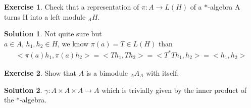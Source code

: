 \documentclass[a4paper]{article}
\theoremstyle{definition}
\theoremstyle{definition}
\theoremstyle{theorem}
\theoremstyle{theorem}
\newtheorem{exercise}{Exercise}
\theoremstyle{definition}
\newtheorem{solution}{Solution}
\begin{document}
\begin{exercise}
    Check that a representation of $\pi : A \rightarrow L(H)$ of a $*$-algebra A turns H into a
    left module ${}_A H$.
\end{exercise}
\begin{solution}
    Not quite sure but \\
    $a \in A$, $h_1, h_2 \in H$, we know $\pi (a) = T \in L(H)$ than
    \begin{align*}
        <\pi (a) h_1, \pi (a) h_2> = <T h_1, T h_2> = <T^*T h_1, h_2> = <h_1, h_2>
    \end{align*}
\end{solution}

\begin{exercise}
    Show that $A$ is a bimodule ${}_A A_A$ with itself.
\end{exercise}

\begin{solution}
    $\gamma: A\times A\times A \rightarrow A$ which is trivially given by the inner product of the $*$-algebra.
\end{solution}
\end{document}
